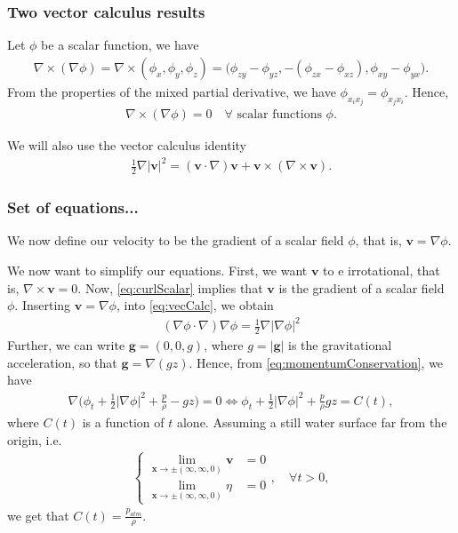 \documentclass[12pt]{article}
\begin{document}
\subsubsection*{Two vector calculus results}

Let $\phi$ be a scalar function, we have
\begin{align}
    \nabla \times (\nabla \phi) = \nabla \times (\phi_x, \phi_y, \phi_z) =
        \big(\phi_{zy} - \phi_{yz}, -(\phi_{zx} - \phi_{xz}), \phi_{xy} - \phi_{yx} \big).
\end{align}
From the properties of the mixed partial derivative, we have $\phi_{x_i x_j} = \phi_{x_j x_i}$. Hence,
\begin{align}
    \label{eq:curlScalar}
    \nabla \times (\nabla \phi) = 0 \quad \forall \text{ scalar functions } \phi.
\end{align}

We will also use the vector calculus identity
\begin{align}
    \label{eq:vecCalc}
    \frac{1}{2}\nabla |\bm{v}|^2 = (\bm{v}\cdot \nabla) \bm{v} + \bm{v} \times (\nabla \times \bm{v}).
\end{align}

\subsubsection{Set of equations...}

We now define our velocity to be the gradient of a scalar field $\phi$, that is, $\bm{v} = \nabla \phi$.

We now want to simplify our equations. First, we want $\bm{v}$ to e irrotational, that is,
$\nabla \times \bm{v} = 0$. Now, \ref{eq:curlScalar} implies that $\bm{v}$ is the gradient of a scalar field
$\phi$. Inserting $\bm{v} = \nabla \phi$, into \eqref{eq:vecCalc}, we obtain
\begin{align}
    (\nabla \phi \cdot \nabla) \nabla \phi = \frac{1}{2}\nabla |\nabla \phi|^2
\end{align}
Further, we can write $\bm{g} = (0,0,g)$, where $g = |\bm{g}|$ is the gravitational acceleration, so that
$\bm{g} = \nabla (gz)$. Hence, from \eqref{eq:momentumConservation}, we have
\begin{align}
    \nabla\bigg(\phi_t + \frac{1}{2}|\nabla \phi|^2 + \frac{p}{\rho} - g z \bigg) = 0
    \iff \phi_t + \frac{1}{2}|\nabla \phi|^2 + \frac{p}{\rho}  g z = C(t),
\end{align}
where $C(t)$ is a function of $t$ alone. Assuming a still water surface far from the origin, i.e.
\begin{align}
    \begin{cases}
	    \lim_{\bm{x} \rightarrow \pm(\infty,\infty, 0)}\bm{v} & = 0 \\
	    \lim_{\bm{x} \rightarrow \pm(\infty,\infty, 0)}\eta   & = 0
	\end{cases}, \quad \forall t > 0,
\end{align}
we get that $C(t) = \frac{p_{atm}}{\rho}$.
\end{document}
